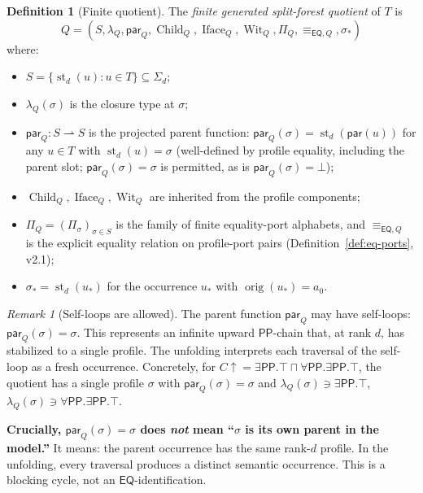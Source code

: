 \documentclass[11pt]{article}
\theoremstyle{definition}
\newtheorem{definition}[theorem]{Definition}
\theoremstyle{remark}
\newtheorem{remark}[theorem]{Remark}
\newcommand{\PP}{\mathsf{PP}}
\newcommand{\EQ}{\mathsf{EQ}}
\newcommand{\st}{\operatorname{st}}
\newcommand{\orig}{\operatorname{orig}}
\newcommand{\Wit}{\operatorname{Wit}}
\newcommand{\Iface}{\operatorname{Iface}}
\newcommand{\Child}{\operatorname{Child}}
\newcommand{\eqQ}{\equiv_{\EQ,Q}}
\begin{document}
\begin{definition}[Finite quotient]\label{def:quotient}
The \emph{finite generated split-forest quotient} of $T$ is
\[
Q = (S, \lambda_Q, \mathsf{par}_Q, \Child_Q, \Iface_Q, \Wit_Q,
\Pi_Q, \eqQ, \sigma_\ast)
\]
where:
\begin{itemize}
\item $S = \{\st_d(u) : u \in T\} \subseteq \Sigma_d$;
\item $\lambda_Q(\sigma)$ is the closure type at $\sigma$;
\item $\mathsf{par}_Q : S \rightharpoonup S$ is the projected parent
  function: $\mathsf{par}_Q(\sigma) = \st_d(\mathsf{par}(u))$ for
  any $u \in T$ with $\st_d(u) = \sigma$ (well-defined by profile
  equality, including the parent slot; $\mathsf{par}_Q(\sigma) =
  \sigma$ is permitted, as is $\mathsf{par}_Q(\sigma) = \bot$);
\item $\Child_Q, \Iface_Q, \Wit_Q$ are inherited from the profile
  components;
\item $\Pi_Q = (\Pi_\sigma)_{\sigma\in S}$ is the family of finite
  equality-port alphabets, and $\eqQ$ is the explicit equality
  relation on profile-port pairs (Definition~\ref{def:eq-ports},
  v2.1);
\item $\sigma_\ast = \st_d(u_\ast)$ for the occurrence $u_\ast$
  with $\orig(u_\ast) = a_0$.
\end{itemize}
\end{definition}

\begin{remark}[Self-loops are allowed]\label{rem:self-loops}
The parent function $\mathsf{par}_Q$ may have self-loops:
$\mathsf{par}_Q(\sigma) = \sigma$.  This represents an infinite
upward $\PP$-chain that, at rank $d$, has stabilized to a single
profile.  The unfolding interprets each traversal of the self-loop
as a fresh occurrence.  Concretely, for $C\!\uparrow = \exists\PP.\top
\sqcap\forall\PP.\exists\PP.\top$, the quotient has a single
profile $\sigma$ with $\mathsf{par}_Q(\sigma) = \sigma$ and
$\lambda_Q(\sigma) \ni \exists\PP.\top$, $\lambda_Q(\sigma) \ni
\forall\PP.\exists\PP.\top$.

\textbf{Crucially, $\mathsf{par}_Q(\sigma) = \sigma$ does \emph{not}
mean ``$\sigma$ is its own parent in the model.''}  It means: the
parent occurrence has the same rank-$d$ profile.  In the unfolding,
every traversal produces a distinct semantic occurrence.  This is
a blocking cycle, not an $\EQ$-identification.
\end{remark}
\end{document}
